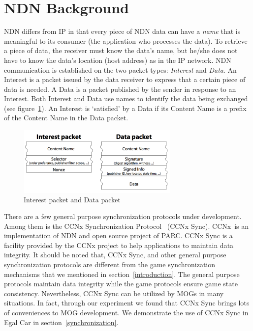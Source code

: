 \documentclass{article}
\begin{document}
\section{NDN Background}
\label{ndnbackground}

NDN differs from IP in that every piece of NDN data can have a \emph{name} that is meaningful to its consumer (the application who processes the data). To retrieve a piece of data, the receiver must know the data's name, but he/she does not have to know the data's location (host address) as in the IP network. NDN communication is established on the two packet types: \emph{Interest} and \emph{Data}. An Interest is a packet issued by the data receiver to express that a certain piece of data is needed. A Data is a packet published by the sender in response to an Interest. Both Interest and Data use names to identify the data being exchanged (see figure~\ref{img:packet_types}). An Interest is `satisfied' by a Data if its Content Name is a prefix of the Content Name in the Data packet.~\cite{Jndn}

\begin{figure}
\begin{center}
\includegraphics[width=0.7\textwidth] {image/packet_types}
\caption{Interest packet and Data packet}
\label{img:packet_types}
\end{center}
\end{figure}

There are a few general purpose synchronization protocols under development. Among them is the CCNx Synchronization Protocol~\cite{CCNxSync} (CCNx Sync). CCNx\textregistered~is an implementation of NDN and open source project of PARC\textregistered. CCNx Sync is a facility provided by the CCNx project to help applications to maintain data integrity. It should be noted that, CCNx Sync, and other general purpose synchronization protocols are different from the game synchronization mechanisms that we mentioned in section~\ref{introduction}. The general purpose protocols maintain data integrity while the game protocols ensure game state consistency. Nevertheless, CCNx Sync can be utilized by MOGs in many situations. In fact, through our experiment we found that CCNx Sync brings lots of conveniences to MOG development. We demonstrate the use of CCNx Sync in Egal Car in section~\ref{synchronization}.
\end{document}
